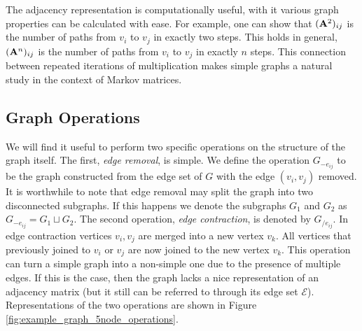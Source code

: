 %
The adjacency representation is computationally useful, with it various graph properties can be calculated with ease. For example, one can show that $({\bf A}^2)_{ij}$ is the number of paths from $v_i$ to $v_j$ in exactly two steps. This holds in general, $({\bf A}^n)_{ij}$ is the number of paths from $v_i$ to $v_j$ in exactly $n$ steps. This connection between repeated iterations of multiplication makes simple graphs a natural study in the context of Markov matrices. 

\subsection{Graph Operations}
We will find it useful to perform two specific operations on the structure of the graph itself. The first, \emph{edge removal}, is simple. We define the operation $G_{-e_{ij}}$ to be the graph constructed from the edge set of $G$ with the edge $(v_i, v_j)$ removed. It is worthwhile to note that edge removal may split the graph into two disconnected subgraphs. If this happens we denote the subgraphs $G_1$ and $G_2$ as $G_{-e_{ij}} = G_1 \sqcup G_2$. The second operation, \emph{edge contraction}, is denoted by $G_{/ e_{ij}}$. In edge contraction vertices $v_i, v_j$ are merged into a new vertex $v_k$. All vertices that previously joined to $v_i$ or $v_j$ are now joined to the new vertex $v_k$. This operation can turn a simple graph into a non-simple one due to the presence of multiple edges. If this is the case, then the graph lacks a nice representation of an adjacency matrix (but it still can be referred to through its edge set $\mathcal{E}$). Representations of the two operations are shown in Figure \ref{fig:example_graph_5node_operations}.
